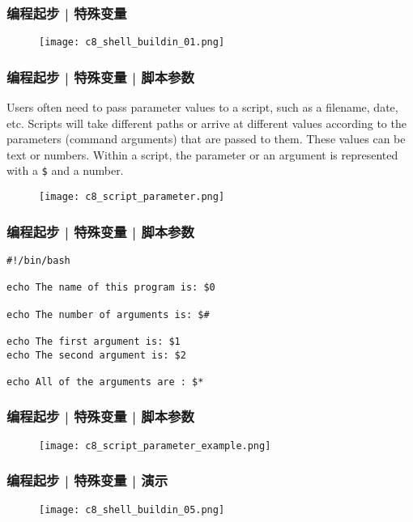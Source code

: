 \begin{frame}
  \frametitle{编程起步 | 特殊变量}
  \begin{figure}
    \centering
    \texttt{[image: c8\_shell\_buildin\_01.png]}
  \end{figure}
\end{frame}

\begin{frame}[fragile]
  \frametitle{编程起步 | 特殊变量 | 脚本参数}
  Users often need to pass parameter values to a script, such as a filename, date, etc. Scripts will take different paths or arrive at different values according to the parameters (command arguments) that are passed to them. These values can be text or numbers. Within a script, the parameter or an argument is represented with a \verb|$| and a number.
  \begin{figure}
    \centering
    \texttt{[image: c8\_script\_parameter.png]}
  \end{figure}
\end{frame}

\begin{frame}[fragile]
  \frametitle{编程起步 | 特殊变量 | \alert{脚本参数}}
\begin{lstlisting}
#!/bin/bash

echo The name of this program is: $0

echo The number of arguments is: $#

echo The first argument is: $1
echo The second argument is: $2

echo All of the arguments are : $*
\end{lstlisting}
\end{frame}

\begin{frame}
  \frametitle{编程起步 | 特殊变量 | 脚本参数}
  \begin{figure}
    \centering
    \texttt{[image: c8\_script\_parameter\_example.png]}
  \end{figure}
\end{frame}

\begin{frame}
  \frametitle{编程起步 | 特殊变量 | 演示}
  \begin{figure}
    \centering
    \texttt{[image: c8\_shell\_buildin\_05.png]}
  \end{figure}
\end{frame}

